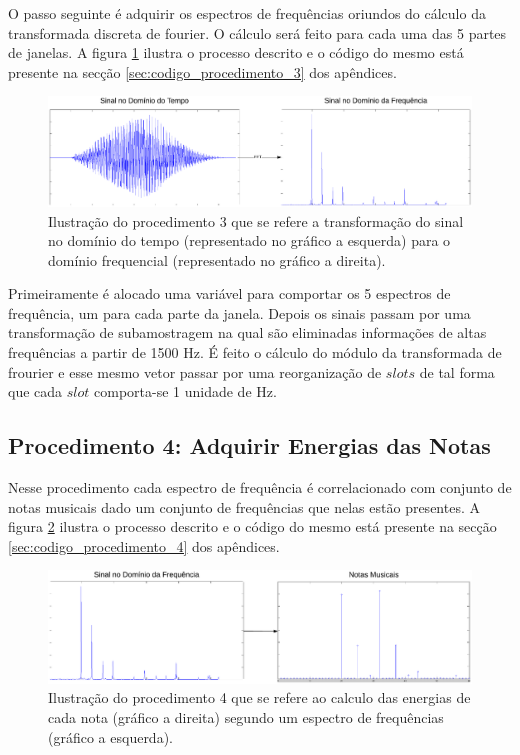 O passo seguinte é adquirir os espectros de frequências oriundos do cálculo da transformada discreta de fourier. O cálculo será feito para cada uma das 5 partes de janelas. A figura \ref{fig:procedimento_3} ilustra o processo descrito e o código do mesmo está presente na secção \ref{sec:codigo_procedimento_3} dos apêndices.

\begin{figure}[h] 
  \centering
    \includegraphics[keepaspectratio=true, scale=0.5]{figuras/procedimento_3}
    \caption{Ilustração do procedimento 3 que se refere a transformação do sinal no domínio do tempo (representado no gráfico a esquerda) para o domínio frequencial (representado no gráfico a direita).}
    \label{fig:procedimento_3}
\end{figure}

Primeiramente é alocado uma variável para comportar os 5 espectros de frequência, um para cada parte da janela. Depois os sinais passam por uma transformação de subamostragem na qual são eliminadas informações de altas frequências a partir de 1500 Hz. É feito o cálculo do módulo da transformada de frourier e esse mesmo vetor passar por uma reorganização de $slots$ de tal forma que cada $slot$ comporta-se 1 unidade de Hz.

\subsection{Procedimento 4: Adquirir Energias das Notas}
\label{subsec:procedimento_4}

Nesse procedimento cada espectro de frequência é correlacionado com conjunto de notas musicais dado um conjunto de frequências que nelas estão presentes. A figura \ref{fig:procedimento_4} ilustra o processo descrito e o código do mesmo está presente na secção \ref{sec:codigo_procedimento_4} dos apêndices.

\begin{figure}[h] 
  \centering
    \includegraphics[keepaspectratio=true, scale=0.55]{figuras/procedimento_4}
    \caption{Ilustração do procedimento 4 que se refere ao calculo das energias de cada nota (gráfico a direita) segundo um espectro de frequências (gráfico a esquerda).}
    \label{fig:procedimento_4}
\end{figure}


